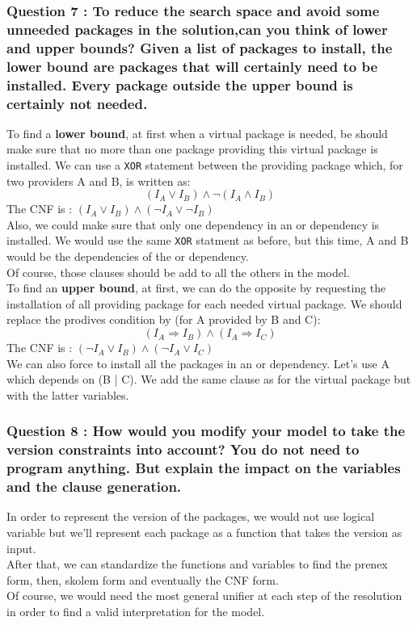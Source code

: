 \documentclass[a4paper,10pt]{article}
\begin{document}
\subsubsection{Question 7 : To reduce the search space and avoid some unneeded packages in the solution,can you think of lower and upper bounds? Given a list of packages to install, the lower bound are packages that will certainly need to be installed. Every package outside the upper bound is certainly not needed.}
To find a \textbf{lower bound}, at first when a virtual package is needed, be should make sure that no more than one package providing this virtual package is installed. We can use a \texttt{XOR} statement between the providing package which, for two providers A and B, is written as:
$$(I_{A} \vee I_{B}) \wedge \neg (I_{A} \wedge I_{B})$$
The CNF is : $(I_{A} \vee I_{B}) \wedge (\neg I_{A} \vee \neg I_{B})$\\
Also, we could make sure that only one dependency in an or dependency is installed.
We would use the same \texttt{XOR} statment as before, but this time, A and B would be the dependencies of the or dependency. \\
Of course, those clauses should be add to all the others in the model.\\

To find an \textbf{upper bound}, at first, we can do the opposite by requesting the installation of all providing package for each needed virtual package. We should replace the prodives condition by (for A provided by B and C): 
$$(I_{A} \Rightarrow I_{B}) \wedge (I_{A} \Rightarrow I_{C})$$ 
The CNF is : $(\neg I_{A} \vee I_{B}) \wedge (\neg I_{A} \vee I_{C})$\\
We can also force to install all the packages in an or dependency. Let's use A which depends on (B | C). We add the same clause as for the virtual package but with the latter variables.

\subsubsection{Question 8 : How would you modify your model to take the version constraints into account? You do not need to program anything. But explain the impact on the variables and the clause generation.}
In order to represent the version of the packages, we would not use logical variable but we'll represent each package as a function that takes the version as input.\\
After that, we can standardize the functions and variables to find the prenex form, then, skolem form and eventually the CNF form.\\
Of course, we would need the most general unifier at each step of the resolution in order to find a valid interpretation for the model.
\end{document}

